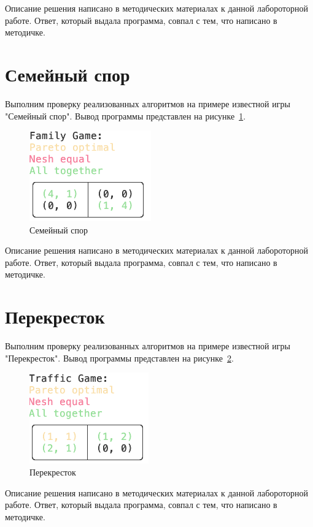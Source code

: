 Описание решения написано в методических материалах к данной лабороторной работе.
Ответ, который выдала программа, совпал с тем, что написано в методичке.

\section{Семейный спор}

Выполним проверку реализованных алгоритмов на примере известной игры "Семейный
спор".
Вывод программы представлен на рисунке~\ref{fig:fig03}.

\begin{figure}
  \centering
  \includegraphics[scale=0.7]{../../artifacts/lw3/family_game.png}
  \caption{Семейный спор}
  \label{fig:fig03}
\end{figure}

Описание решения написано в методических материалах к данной лабороторной работе.
Ответ, который выдала программа, совпал с тем, что написано в методичке.

\section{Перекресток}

Выполним проверку реализованных алгоритмов на примере известной игры "Перекресток".
Вывод программы представлен на рисунке~\ref{fig:fig04}.

\begin{figure}
  \centering
  \includegraphics[scale=0.7]{../../artifacts/lw3/traffic_game.png}
  \caption{Перекресток}
  \label{fig:fig04}
\end{figure}

Описание решения написано в методических материалах к данной лабороторной работе.
Ответ, который выдала программа, совпал с тем, что написано в методичке.
